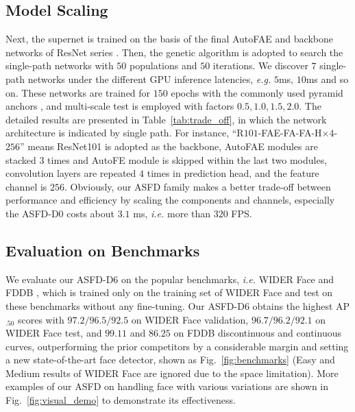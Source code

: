 \documentclass[sigconf]{acmart}
\begin{document}
\subsection{Model Scaling}
Next, the supernet is trained on the basis of the final AutoFAE and backbone networks of ResNet series \cite{he2016resnet}. Then, the genetic algorithm is adopted to search the single-path networks with $50$ populations and $50$ iterations. We discover $7$ single-path networks under the different GPU inference latencies, \textit{e.g.} $5$ms, $10$ms and so on. These networks are trained for $150$ epochs with the commonly used pyramid anchors \cite{tang2018pyramidbox}, and multi-scale test is employed with factors $0.5,1.0,1.5,2.0$. The detailed results are presented in Table~\ref{tab:trade_off}, in which the network architecture is indicated by single path. For instance, ``R$101$-FAE-FA-FA-H$\times4$-$256$'' means ResNet101 is adopted as the backbone, AutoFAE modules are stacked $3$ times and AutoFE module is skipped within the last two modules, convolution layers are repeated $4$ times in prediction head, and the feature channel is $256$. Obviously, our ASFD family makes a better trade-off between performance and efficiency by scaling the components and channels, especially the ASFD-D$0$ costs about $3.1$ ms, \textit{i.e.} more than 320 FPS.


\subsection{Evaluation on Benchmarks}
We evaluate our ASFD-D$6$ on the popular benchmarks, \textit{i.e.} WIDER Face \cite{yang2016wider} and FDDB \cite{jain2010fddb}, which is trained only on the training set of WIDER Face and test on these benchmarks without any fine-tuning. 
Our ASFD-D$6$ obtains the highest AP$_{.50}$ scores with $97.2/96.5/92.5$ on WIDER Face validation, $96.7/96.2/92.1$ on WIDER Face test, and $99.11$ and $86.25$ on FDDB discontinuous and continuous curves, outperforming the prior competitors by a considerable margin and setting a new state-of-the-art face detector, shown as Fig.~\ref{fig:benchmarks} (Easy and Medium results of WIDER Face are ignored due to the space limitation). More examples of our ASFD on handling face with various variations are shown in Fig.~\ref{fig:visual_demo} to demonstrate its effectiveness.
\end{document}
